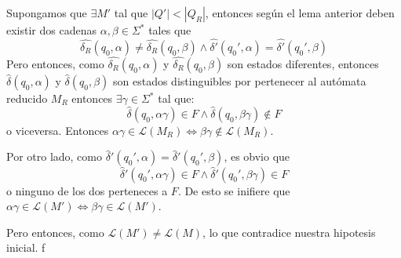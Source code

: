 \begin{demo}[0.8\textwidth]
  Supongamos que \(\exists M'\) tal que \( |Q'| < |Q_R|\), entonces según el lema anterior deben existir dos cadenas \(\alpha,\beta\in\Sigma^*\) tales que
  \[
    \hat{\delta_R}(q_0,\alpha) \neq \hat{\delta_R}(q_0,\beta) \land \hat{\delta'}(q_0',\alpha) = \hat{\delta'}(q_0',\beta)
  \]
  Pero entonces, como \(\hat{\delta_R}(q_0,\alpha)\) y \(\hat{\delta_R}(q_0,\beta)\) son estados diferentes, entonces \(\hat{\delta}(q_0,\alpha)\) y \(\hat{\delta}(q_0,\beta)\) son estados distinguibles por pertenecer al autómata reducido \(M_R\) entonces \(\exists\gamma\in\Sigma^*\) tal que:
  \[
    \hat{\delta}(q_0,\alpha\gamma)\in F \land \hat{\delta}(q_0,\beta\gamma)\notin F
  \]
  o viceversa. Entonces \(\alpha\gamma\in\mathcal{L}(M_R) \iff \beta\gamma\notin\mathcal{L}(M_R)\).

  Por otro lado, como \(\hat\delta'(q_0',\alpha) = \hat\delta'(q_0',\beta)\), es obvio que \[
    \hat\delta'(q_0',\alpha\gamma)\in F\land \hat\delta'(q_0',\beta\gamma)\in F
  \] o ninguno de los dos perteneces a \(F\). De esto se inifiere que \(\alpha\gamma\in\mathcal{L}(M') \iff \beta\gamma\in\mathcal{L}(M')\).

  Pero entonces, como \(\mathcal{L}(M') \neq \mathcal{L}(M)\), lo que contradice nuestra hipotesis inicial.
  f\end{demo}
